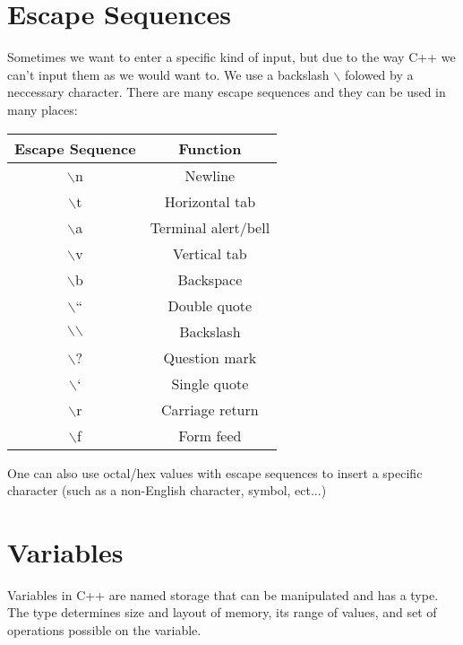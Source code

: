 \documentclass[12pt, a4paper]{report}
\begin{document}
\section{Escape Sequences}
Sometimes we want to enter a specific kind of input, but due to the way C++ we can't input them as we would want to. We use a backslash $\backslash$ folowed by a neccessary character. There are many escape sequences and they can be used in many places:
\begin{center}
	\begin{tabular}{ |c|c| }
		\hline
		\textbf{Escape Sequence} & \textbf{Function} \\
		\hline
		$\backslash$n & Newline \\
		\hline
		$\backslash$t & Horizontal tab \\
		\hline
		$\backslash$a & Terminal alert/bell \\
		\hline
		$\backslash$v & Vertical tab \\
		\hline
		$\backslash$b & Backspace \\
		\hline
		$\backslash$`` & Double quote \\
		\hline
		$\backslash$$\backslash$ & Backslash \\
		\hline
		$\backslash$? & Question mark \\
		\hline
		$\backslash$` & Single quote \\
		\hline
		$\backslash$r & Carriage return \\
		\hline
		$\backslash$f & Form feed \\
		\hline
	\end{tabular}
\end{center}
One can also use octal/hex values with escape sequences to insert a specific character (such as a non-English character, symbol, ect...)
\section{Variables}
Variables in C++ are named storage that can be manipulated and has a type. The type determines size and layout of memory, its range of values, and set of operations possible on the variable.
\end{document}
